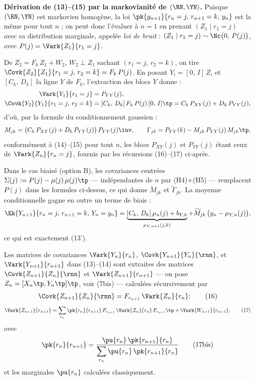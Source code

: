 \documentclass[12pt, a4paper]{article}
\begin{document}
{\color{blue}
\noindent\textbf{Dérivation de (13)--(15) par la markovianité de $(\RN,\YN)$.}
Puisque $(\RN,\YN)$ est markovien homogène, la loi $\pk{y_{n+1}}{r_n=j,\,r_{n+1}=k,\,y_n}$
est la même pour tout $n$ ; on peut donc l'évaluer à $n=1$ en prenant $(Z_1 \mid r_1=j)$
avec sa distribution marginale, appelée \emph{loi de bruit} :
$(Z_1 \mid r_1=j) \sim \Nc\bigl(0,\,P(j)\bigr)$, avec $P(j) = \Vark{Z_1}{r_1=j}$.

De $Z_2 = F_k\,Z_1 + W_2$, $W_2 \perp Z_1$ sachant $(r_1=j,\,r_2=k)$,
on tire $\Covk{Z_2}{Z_1}{r_1=j,\,r_2=k} = F_k\,P(j)$.
En posant $Y_i = [0,\,I]\,Z_i$ et $[C_k,\,D_k]$ la ligne $Y$ de $F_k$,
l'extraction des blocs $Y$ donne :
\begin{align*}
  \Vark{Y_1}{r_1=j}
    &= P_{YY}(j), \\
  \Covk{Y_2}{Y_1}{r_1=j,\,r_2=k}
    &= [C_k,\,D_k]\,F_k\,P(j)\,[0,\,I]\tp
     = C_k\,P_{XY}(j) + D_k\,P_{YY}(j),
\end{align*}
d'où, par la formule du conditionnement gaussien :
\[
  M_{jk} = \bigl(C_k\,P_{XY}(j) + D_k\,P_{YY}(j)\bigr)\,P_{YY}(j)\inv,
  \qquad
  \Gamma_{jk} = P_{YY}(k) - M_{jk}\,P_{YY}(j)\,M_{jk}\tp,
\]
conformément à (14)--(15) pour tout $n$, les blocs $P_{XY}(j)$ et $P_{YY}(j)$
étant ceux de $\Vark{Z_n}{r_n=j}$, fournis par les récursions (16)--(17) ci-après.

{\color{green!60!black}
Dans le cas biaisé (option B), les covariances centrées
$\Sigma(j) := P(j) - \mu(j)\,\mu(j)\tp$ --- indépendantes de $n$ par (H4)+(H5) ---
remplacent $P(j)$ dans les formules ci-dessus, ce qui donne $\widetilde{M}_{jk}$ et $\widetilde{\Gamma}_{jk}$.
La moyenne conditionnelle gagne en outre un terme de biais :
\[
  \Ek{Y_{n+1}}{r_n=j,\,r_{n+1}=k,\,Y_n=y_n}
  = \underbrace{[C_k,\,D_k]\,\mu_n(j) + b_{Y,k}}_{\mu_{Y,n+1}(j,k)}
    + \widetilde{M}_{jk}\,\bigl(y_n - \mu_{Y,n}(j)\bigr),
\]
ce qui est exactement (13').}
}%

Les matrices de covariances $\Vark{Y_n}{r_n}$, $\Covk{Y_{n+1}}{Y_n}{\rnn}$, et
$\Vark{Y_{n+1}}{r_{n+1}}$ dans (13)--(14) sont extraites des matrices
$\Covk{Z_{n+1}}{Z_n}{\rnn}$ et $\Vark{Z_{n+1}}{r_{n+1}}$
--- on pose $Z_n = [X_n\tp, Y_n\tp]\tp$, voir (7bis) --- calculées récursivement par
\begin{equation}
  \Covk{Z_{n+1}}{Z_n}{\rnn} = F_{r_{n+1}}\,\Vark{Z_n}{r_n}; \tag{16}
\end{equation}
\begin{equation}
  \Vark{Z_{n+1}}{r_{n+1}}
  = \sum_{r_n} \pk{r_n}{r_{n+1}}\,F_{r_{n+1}}\,\Vark{Z_n}{r_n}\,F_{r_{n+1}}\tp
    + \Vark{W_{n+1}}{r_{n+1}}, \tag{17}
\end{equation}
avec
\begin{equation}
  \pk{r_n}{r_{n+1}} = \frac{\pu{r_n}\,\pk{r_{n+1}}{r_n}}%
    {\displaystyle\sum_{r_n} \pu{r_n}\,\pk{r_{n+1}}{r_n}}
  \tag{17bis}
\end{equation}
et les marginales $\pu{r_n}$ calculées classiquement.
\end{document}
